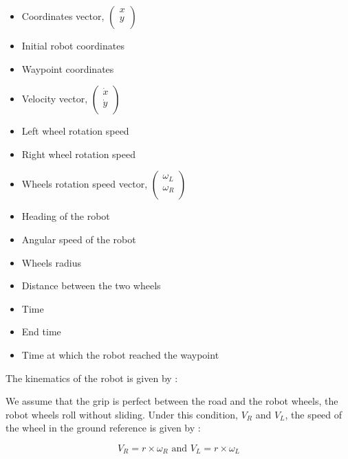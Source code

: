 \documentclass[../main.tex]{subfiles}
\begin{document}
\begin{itemize}
	\item{} Coordinates vector, 
	$\begin{pmatrix}
		x\\
		y\\
	\end{pmatrix}$
	\item{} Initial robot coordinates
	\item{} Waypoint coordinates
	\item{} Velocity vector, 
	$\begin{pmatrix}
		\dot{x}\\
		\dot{y}\\
	\end{pmatrix}$
	\item{} Left wheel rotation speed
	\item{} Right wheel rotation speed
	\item{\makebox[2cm][l]{$\omega$}} Wheels rotation speed vector, 
	$\begin{pmatrix}
		\omega_L\\
		\omega_R\\
	\end{pmatrix}$
	\item{\makebox[2cm][l]{$\theta$}} Heading of the robot
	\item{\makebox[2cm][l]{$\dot{\theta}$}} Angular speed of the robot
	\item{} Wheels radius
	\item{} Distance between the two wheels
	\item{} Time
	\item{} End time
	\item{} Time at which the robot reached the waypoint
\end{itemize}

The kinematics of the robot is given by :

We assume that the grip is perfect between the road and the robot wheels, the robot wheels roll without sliding. Under this condition, $V_R$ and $V_L$, the speed of the wheel in the ground reference is given by :

$$\displaystyle V_R = r \times \omega_R \text{     and     } V_L = r \times \omega_L$$
\end{document}

